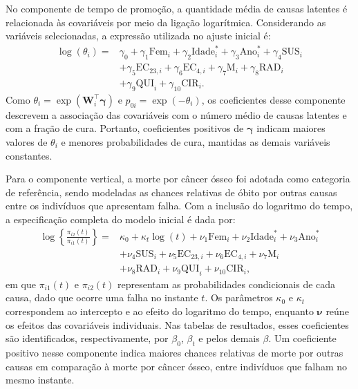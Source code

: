 \documentclass[11pt,a4paper]{article}
\begin{document}
No componente de tempo de promoção, a quantidade média de causas latentes é relacionada às covariáveis por meio da ligação logarítmica. Considerando as variáveis selecionadas, a expressão utilizada no ajuste inicial é:
\begin{equation}
\begin{aligned}
\log(\theta_i)={}&\gamma_0+\gamma_1\mathrm{Fem}_i
+\gamma_2\mathrm{Idade}_i^*+\gamma_3\mathrm{Ano}_i^*
+\gamma_4\mathrm{SUS}_i\\
&+\gamma_5\mathrm{EC}_{23,i}+\gamma_6\mathrm{EC}_{4,i}
+\gamma_7\mathrm{M}_i+\gamma_8\mathrm{RAD}_i\\
&+\gamma_9\mathrm{QUI}_i+\gamma_{10}\mathrm{CIR}_i.
\end{aligned}
\label{eq:aplicacao_promocao}
\end{equation}
Como $\theta_i=\exp(\bm W_i^\top\bm\gamma)$ e $p_{0i}=\exp(-\theta_i)$, os coeficientes desse componente descrevem a associação das covariáveis com o número médio de causas latentes e com a fração de cura. Portanto, coeficientes positivos de $\bm\gamma$ indicam maiores valores de $\theta_i$ e menores probabilidades de cura, mantidas as demais variáveis constantes.

Para o componente vertical, a morte por câncer ósseo foi adotada como categoria de referência, sendo modeladas as chances relativas de óbito por outras causas entre os indivíduos que apresentam falha. Com a inclusão do logaritmo do tempo, a especificação completa do modelo inicial é dada por:
\begin{equation}
\begin{aligned}
\log\!\left\{\frac{\pi_{i2}(t)}{\pi_{i1}(t)}\right\}
={}&\kappa_0+\kappa_t\log(t)+\nu_1\mathrm{Fem}_i
+\nu_2\mathrm{Idade}_i^*+\nu_3\mathrm{Ano}_i^*\\
&+\nu_4\mathrm{SUS}_i+\nu_5\mathrm{EC}_{23,i}
+\nu_6\mathrm{EC}_{4,i}+\nu_7\mathrm{M}_i\\
&+\nu_8\mathrm{RAD}_i+\nu_9\mathrm{QUI}_i
+\nu_{10}\mathrm{CIR}_i,
\end{aligned}
\label{eq:aplicacao_vertical_completo}
\end{equation}
\noindent em que $\pi_{i1}(t)$ e $\pi_{i2}(t)$ representam as probabilidades condicionais de cada causa, dado que ocorre uma falha no instante $t$. Os parâmetros $\kappa_0$ e $\kappa_t$ correspondem ao intercepto e ao efeito do logaritmo do tempo, enquanto $\bm\nu$ reúne os efeitos das covariáveis individuais. Nas tabelas de resultados, esses coeficientes são identificados, respectivamente, por $\beta_0$, $\beta_t$ e pelos demais $\beta$. Um coeficiente positivo nesse componente indica maiores chances relativas de morte por outras causas em comparação à morte por câncer ósseo, entre indivíduos que falham no mesmo instante.
\end{document}
